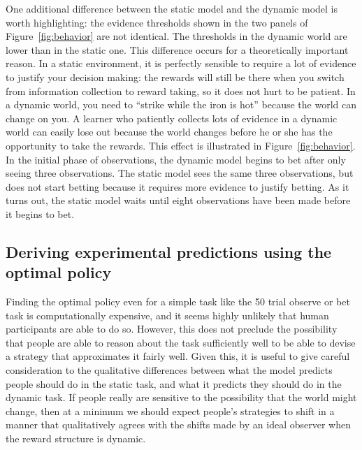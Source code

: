 \documentclass[authoryear]{elsarticle}
\newcommand{\subsectionX}[1]{\subsection{#1}}
\begin{document}
One additional difference between the static model and the dynamic model is worth highlighting: the evidence thresholds shown in the two panels of Figure~\ref{fig:behavior} are not identical. The thresholds in the dynamic world are lower than in the static one. This difference occurs for a theoretically important reason. In a static environment, it is perfectly sensible to require a lot of evidence to justify your decision making: the rewards will still be there when you switch from information collection to reward taking, so it does not hurt to be patient. In a dynamic world, you need to ``strike while the iron is hot'' because the world can change on you. A learner who patiently collects lots of evidence in a dynamic world can easily lose out because the world changes before he or she has the opportunity to take the rewards. This effect is illustrated in Figure~\ref{fig:behavior}. In the initial phase of observations, the dynamic model begins to bet after only seeing three observations. The static model sees the same three observations, but does not start betting because it requires more evidence to justify betting. As it turns out, the static model waits until eight observations have been made before it begins to bet.


\subsectionX{Deriving experimental predictions using the optimal policy}

Finding the optimal policy even for a simple task like the 50 trial observe or bet task is computationally expensive, and it seems highly unlikely that human participants are able to do so. However, this does not preclude the possibility that people are able to reason about the task sufficiently well to be able to devise a strategy that approximates it fairly well. Given this, it is useful to give careful consideration to the qualitative differences between what the model predicts people should do in the static task, and what it predicts they should do in the dynamic task. If people really are sensitive to the possibility that the world might change, then at a minimum we should expect people's strategies to shift in a manner that qualitatively agrees with the shifts made by an ideal observer when the reward structure is dynamic.
\end{document}
